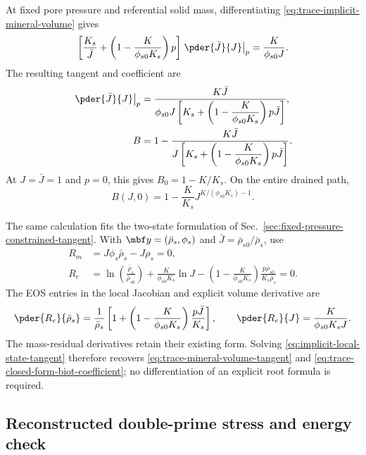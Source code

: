 At fixed pore pressure and referential solid mass, differentiating
\eqref{eq:trace-implicit-mineral-volume} gives
\begin{equation}
 \left[\frac{K_s}{\bar J}
 +\left(1-\frac{K}{\phi_{s0}K_s}\right)p\right]
 \left.\pder{\bar J}{J}\right|_p=\frac{K}{\phi_{s0}J}.
 \label{eq:trace-mineral-tangent-system}
\end{equation}
The resulting tangent and coefficient are
\begin{align}
 \left.\pder{\bar J}{J}\right|_p
 &=\frac{K\bar J}
 {\phi_{s0}J\left[K_s+\left(1-\dfrac{K}{\phi_{s0}K_s}\right)p\bar J\right]},
 \label{eq:trace-mineral-volume-tangent}\\
 B&=1-
 \frac{K\bar J}
 {J\left[K_s+\left(1-\dfrac{K}{\phi_{s0}K_s}\right)p\bar J\right]}.
 \label{eq:trace-closed-form-biot-coefficient}
\end{align}
At \(J=\bar J=1\) and \(p=0\), this gives \(B_0=1-K/K_s\).
On the entire drained path,
\begin{equation}
 B(J,0)=1-\frac{K}{K_s}J^{K/(\phi_{s0}K_s)-1}.
 \label{eq:trace-drained-biot-coefficient}
\end{equation}

The same calculation fits the two-state formulation of
Sec.~\ref{sec:fixed-pressure-constrained-tangent}.  With
\(\mbf y=(\bar\rho_s,\phi_s)\) and
\(\bar J=\bar\rho_{s0}/\bar\rho_s\), use
\begin{align}
 R_m&=J\phi_s\bar\rho_s-J\rho_s=0,
 \label{eq:trace-local-mass-residual}\\
 R_e&=\ln\left(\frac{\bar\rho_s}{\bar\rho_{s0}}\right)
 +\frac{K}{\phi_{s0}K_s}\ln J
 -\left(1-\frac{K}{\phi_{s0}K_s}\right)
 \frac{p\bar\rho_{s0}}{K_s\bar\rho_s}=0.
 \label{eq:trace-local-mineral-residual}
\end{align}
The EOS entries in the local Jacobian and explicit volume derivative are
\begin{equation}
 \pder{R_e}{\bar\rho_s}
 =\frac{1}{\bar\rho_s}\left[
 1+\left(1-\frac{K}{\phi_{s0}K_s}\right)\frac{p\bar J}{K_s}\right],
 \qquad
 \pder{R_e}{J}=\frac{K}{\phi_{s0}K_sJ}.
 \label{eq:trace-local-residual-derivatives}
\end{equation}
The mass-residual derivatives retain their existing form.  Solving
\eqref{eq:implicit-local-state-tangent} therefore recovers
\eqref{eq:trace-mineral-volume-tangent} and
\eqref{eq:trace-closed-form-biot-coefficient}; no differentiation of an
explicit root formula is required.

\subsection{Reconstructed double-prime stress and energy check}

